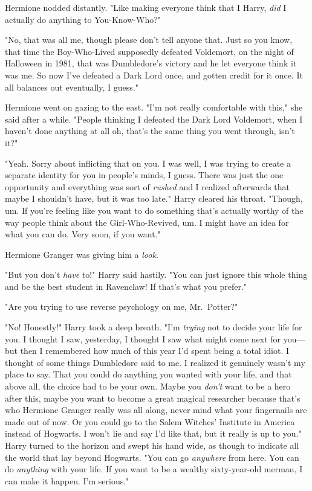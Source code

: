Hermione nodded distantly. "Like making everyone think that I{\el} Harry,
\emph{did} I actually do anything to You-Know-Who?"

"No, that was all me, though please don't tell anyone that. Just so you know,
that time the Boy-Who-Lived supposedly defeated Voldemort, on the night of
Halloween in 1981, that was Dumbledore's victory and he let everyone think it
was me. So now I've defeated a Dark Lord once, and gotten credit for it once.
It all balances out eventually, I guess."

Hermione went on gazing to the east. "I'm not really comfortable with this,"
she said after a while. "People thinking I defeated the Dark Lord Voldemort,
when I haven't done anything at all{\el} oh, that's the same thing you went
through, isn't it?"

"Yeah. Sorry about inflicting that on you. I was{\el} well, I was trying to
create a separate identity for you in people's minds, I guess. There was just
the one opportunity and everything was sort of \emph{rushed} and{\el} I
realized afterwards that maybe I shouldn't have, but it was too late." Harry
cleared his throat. "Though, um. If you're feeling like you want to do
something that's actually worthy of the way people think about the
Girl-Who-Revived, um. I might have an idea for what you can do. Very soon, if
you want."

Hermione Granger was giving him a \emph{look.}

"But you don't \emph{have} to!" Harry said hastily. "You can just ignore this
whole thing and be the best student in Ravenclaw! If that's what you prefer."

"Are you trying to use reverse psychology on me, Mr.~Potter?"

"No! Honestly!" Harry took a deep breath. "I'm \emph{trying} not to decide your
life for you. I thought I saw, yesterday, I thought I saw what might come next
for you—but then I remembered how much of this year I'd spent being a total
idiot. I thought of some things Dumbledore said to me. I realized it genuinely
wasn't my place to say. That you could do anything you wanted with your life,
and that above all, the choice had to be your own. Maybe you \emph{don't} want
to be a hero after this, maybe you want to become a great magical researcher
because that's who Hermione Granger really was all along, never mind what your
fingernails are made out of now. Or you could go to the Salem Witches'
Institute in America instead of Hogwarts. I won't lie and say I'd like that,
but it really is up to you." Harry turned to the horizon and swept his hand
wide, as though to indicate all the world that lay beyond Hogwarts. "You can go
\emph{anywhere} from here. You can do \emph{anything} with your life. If you
want to be a wealthy sixty-year-old merman, I can make it happen. I'm serious."


